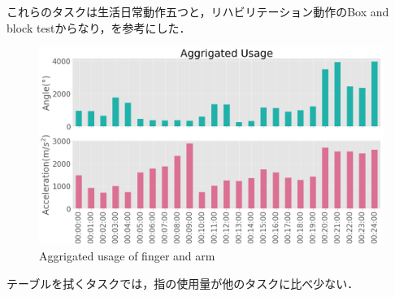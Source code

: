 これらのタスクは生活日常動作五つと，リハビリテーション動作のBox and block testからなり，\cite{Taub2011,Mathiowetz1985}を参考にした．


\begin{figure}[H]
  \centering
  \includegraphics[width=0.8\linewidth]{fig/result}
  \caption{Aggrigated usage of finger and arm}
  \label{fig:usage}
\end{figure}


テーブルを拭くタスクでは，指の使用量が他のタスクに比べ少ない．

